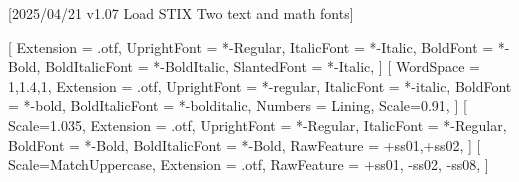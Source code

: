 
[2025/04/21 v1.07 Load STIX Two text and math fonts]

%
%
\ifpdftex
	\RequirePackage[T1]{fontenc}	
	\RequirePackage{bm}
\else
    \RequirePackage[warnings-off={mathtools-colon,mathtools-overbracket}]{unicode-math}
    \setmainfont{STIXTwoText}[
       	Extension = .otf,
    	UprightFont = *-Regular,
    	ItalicFont = *-Italic,
    	BoldFont = *-Bold,
    	BoldItalicFont = *-BoldItalic,
		SlantedFont = *-Italic,
	]
	\setsansfont{texgyreheros}[ 
		WordSpace = {1,1.4,1},
		Extension = .otf,
    	UprightFont = *-regular,
    	ItalicFont = *-italic,
    	BoldFont = *-bold,
    	BoldItalicFont = *-bolditalic,
		Numbers = Lining,
    	Scale=0.91,%
	]        
	\setmonofont{Inconsolatazi4}[
        Scale=1.035,%
        Extension = .otf,
        UprightFont = *-Regular,
        ItalicFont = *-Regular,%
        BoldFont = *-Bold, 
    	BoldItalicFont = *-Bold,%
        RawFeature = {+ss01,+ss02}, %
    ]             
	[
    	Scale=MatchUppercase,
    	Extension = .otf,
    	RawFeature = {+ss01, -ss02, -ss08},
   ]
   \newcommand*{\FRAC}[1]{{\addfontfeature{Fractions=On}#1}}%
\fi
